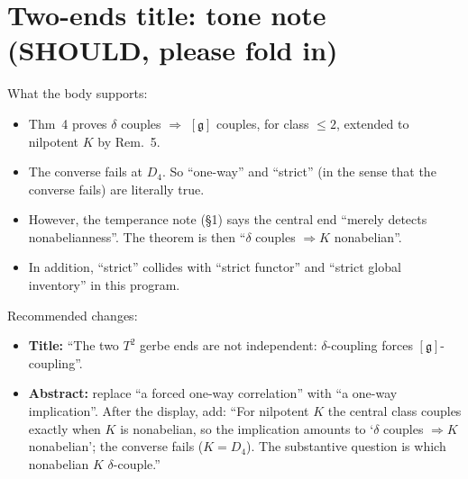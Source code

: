 \documentclass[10pt]{article}
\begin{document}
\section{Two-ends title: tone note (SHOULD, please fold in)}
What the body supports:
\begin{itemize}
\item Thm~4 proves $\delta$ couples $\Rightarrow$ $[\mathfrak g]$ couples, for class $\le2$, extended to nilpotent $K$ by Rem.~5.
\item The converse fails at $D_4$. So ``one-way'' and ``strict'' (in the sense that the converse fails) are literally true.
\item However, the temperance note (\S1) says the central end ``merely detects nonabelianness''. The theorem is then ``$\delta$ couples $\Rightarrow K$ nonabelian''.
\item In addition, ``strict'' collides with ``strict functor'' and ``strict global inventory'' in this program.
\end{itemize}
Recommended changes:
\begin{itemize}
\item \textbf{Title:} ``The two $T^2$ gerbe ends are not independent: $\delta$-coupling forces $[\mathfrak g]$-coupling''.
\item \textbf{Abstract:} replace ``a forced one-way correlation'' with ``a one-way implication''. After the display, add: ``For nilpotent $K$ the central class couples exactly when $K$ is nonabelian, so the implication amounts to `$\delta$ couples $\Rightarrow K$ nonabelian'; the converse fails ($K=D_4$). The substantive question is which nonabelian $K$ $\delta$-couple.''
\end{itemize}
\end{document}
